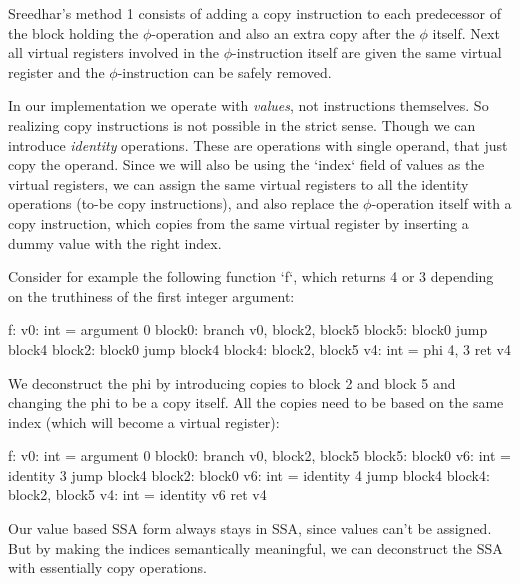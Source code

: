 Sreedhar's method 1 consists of adding a copy instruction to each predecessor of
the block holding the $\phi$-operation and also an extra copy after the $\phi$
itself. Next all virtual registers involved in the $\phi$-instruction itself are
given the same virtual register and the $\phi$-instruction can be safely
removed.

In our implementation we operate with {\em values}, not instructions themselves.
So realizing copy instructions is not possible in the strict sense. Though we
can introduce {\em identity} operations. These are operations with single
operand, that just copy the operand. Since we will also be using the `index`
field of values as the virtual registers, we can assign the same virtual
registers to all the identity operations (to-be copy instructions), and also
replace the $\phi$-operation itself with a copy instruction, which copies from
the same virtual register by inserting a dummy value with the right index.

Consider for example the following function `f`, which returns 4 or 3 depending
on the truthiness of the first integer argument:

\beggtt
f:
        v0: int = argument 0
block0:
        branch v0, block2, block5
block5: block0
        jump block4
block2: block0
        jump block4
block4: block2, block5
        v4: int = phi 4, 3
        ret v4
\endtt

We deconstruct the phi by introducing copies to block 2 and block 5 and changing
the phi to be a copy itself. All the copies need to be based on the same index
(which will become a virtual register):

\begtt
f:
        v0: int = argument 0
block0:
        branch v0, block2, block5
block5: block0
        v6: int = identity 3
        jump block4
block2: block0
        v6: int = identity 4
        jump block4
block4: block2, block5
        v4: int = identity v6
        ret v4
\endtt

Our value based SSA form always stays in SSA, since values can't be assigned.
But by making the indices semantically meaningful, we can deconstruct the SSA
with essentially copy operations.

